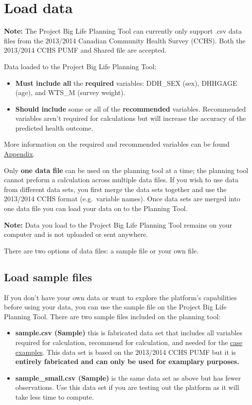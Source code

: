 \documentclass[]{book}
\providecommand{\tightlist}{%
  \setlength{\itemsep}{0pt}\setlength{\parskip}{0pt}}
\begin{document}
\hypertarget{load-data}{%
\section{Load data}\label{load-data}}

\textbf{Note:} The Project Big Life Planning Tool can currently only support .csv data files from the 2013/2014 Canadian Community Health Survey (CCHS). Both the 2013/2014 CCHS PUMF and Shared file are accepted.

Data loaded to the Project Big Life Planning Tool:

\begin{itemize}
\item
  \textbf{Must include all} the \textbf{required} variables: DDH\_SEX (sex), DHHGAGE (age), and WTS\_M (survey weight).
\item
  \textbf{Should include} some or all of the \textbf{recommended} variables. Recommended variables aren't required for calculations but will increase the accuracy of the predicted health outcome.
\end{itemize}

More information on the required and recommended variables can be found \protect\hyperlink{mport}{Appendix}.

Only \textbf{one data file} can be used on the planning tool at a time; the planning tool cannot preform a calculation across multiple data files. If you wish to use data from different data sets, you first merge the data sets together and use the 2013/2014 CCHS format (e.g.~variable names). Once data sets are merged into one data file you can load your data on to the Planning Tool.

\textbf{Note:} Data you load to the Project Big Life Planning Tool remains on your computer and is not uploaded or sent anywhere.

There are two options of data files: a sample file or your own file.

\hypertarget{load-sample-files}{%
\subsection{Load sample files}\label{load-sample-files}}

If you don't have your own data or want to explore the platform's capabilities before using your data, you can use the sample file on the Project Big Life Planning Tool. There are two sample files included on the planning tool:

\begin{itemize}
\tightlist
\item
  \textbf{sample.csv (Sample)} this is fabricated data set that includes all variables required for calculation, recommend for calculation, and needed for the \protect\hyperlink{caseexamples}{case examples}. This data set is based on the 2013/2014 CCHS PUMF but it is \textbf{entirely fabricated and can only be used for examplary purposes.}
\item
  \textbf{sample\_small.csv (Sample)} is the same data set as above but has fewer observations. Use this data set if you are testing out the platform as it will take less time to compute.
\end{itemize}
\end{document}
